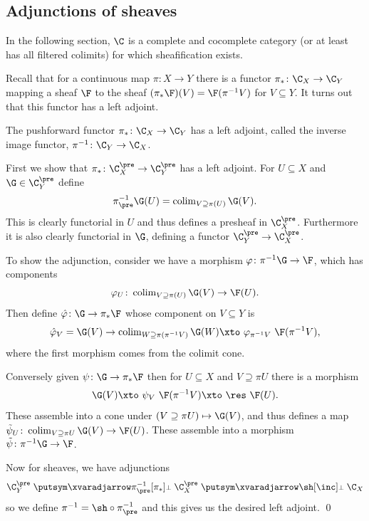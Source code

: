 \subsection{Adjunctions of sheaves}

In the following section, $\C$ is a complete and cocomplete category (or at least has all filtered colimits) for which
sheafification exists.

Recall that for a continuous map $\pi\colon X\to Y$ there is a functor $\pi_*\colon\C_X\to\C_Y$ mapping a sheaf $\F$ to
the sheaf $(\pi_*\F)(V)=\F(\pi^{-1}V)$ for $V\subseteq Y$.
It turns out that this functor has a left adjoint.

\bthrm

    The pushforward functor $\pi_*\colon\C_X\to\C_Y$ has a left adjoint, called the {\emphcolor inverse image functor},
    $\pi^{-1}\colon\C_Y\to\C_X$.

\ethrm

\bproof

    First we show that $\pi_*\colon\C_X^\pre\to\C_Y^\pre$ has a left adjoint.
    For $U\subseteq X$ and $\G\in\C_Y^\pre$ define
    $$ \pi^{-1}_\pre\G(U) = \colim_{V\supseteq\pi(U)}\G(V) . $$
    This is clearly functorial in $U$ and thus defines a presheaf in $\C_X^\pre$.
    Furthermore it is also clearly functorial in $\G$, defining a functor $\C_Y^\pre\to\C_X^\pre$.

    To show the adjunction, consider we have a morphism $\phi\colon\pi^{-1}\G \to \F$, which has components
    $$ \phi_U \colon \colim_{V\supseteq\pi(U)}\G(V) \to \F(U) . $$
    Then define $\hat\phi\colon\G\to\pi_*\F$ whose component on $V\subseteq Y$ is
    $$ \hat\phi_V = \G(V) \to \colim_{W\supseteq\pi(\pi^{-1}V)}\G(W) \xtos{\phi_{\pi^{-1}V}} \F(\pi^{-1}V) , $$
    where the first morphism comes from the colimit cone.

    Conversely given $\psi\colon\G\to\pi_*\F$ then for $U\subseteq X$ and $V\supseteq\pi U$ there is a morphism
    $$ \G(V) \xtos{\psi_V} \F(\pi^{-1}V) \xtos\res \F(U) . $$
    These assemble into a cone under $(V\supseteq\pi U)\mapsto\G(V)$, and thus defines a map
    $\tilde\psi_U\colon\colim_{V\supseteq\pi U}\G(V)\to\F(U)$.
    These assemble into a morphism $\tilde\psi\colon\pi^{-1}\G\to\F$.

    Now for sheaves, we have adjunctions
    $$ \C_Y^\pre\adjarrow{\pi^{-1}_\pre}{\pi_*}\C_X^\pre\adjarrow{\sh}{\inc}\C_X $$
    so we define $\pi^{-1}=\sh\circ\pi^{-1}_\pre$ and this gives us the desired left adjoint.
    \qed

